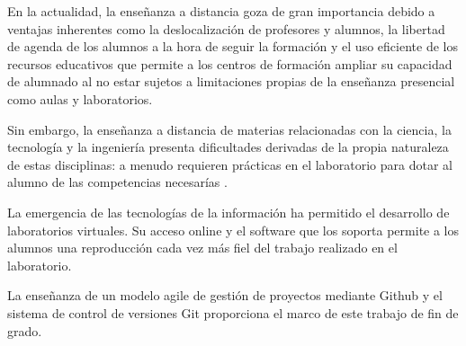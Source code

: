 
En la actualidad, la enseñanza a distancia goza de gran importancia debido a ventajas inherentes como la deslocalización de profesores y alumnos, la libertad de agenda de los alumnos a la hora de seguir la formación y el uso eficiente de los recursos educativos que permite a los centros de formación ampliar su capacidad de alumnado al no estar sujetos a limitaciones propias de la enseñanza presencial como aulas y laboratorios.

Sin embargo, la enseñanza a distancia de materias relacionadas con la ciencia, la tecnología y  la ingeniería  presenta dificultades derivadas de la propia naturaleza de estas disciplinas: a menudo requieren prácticas en el laboratorio para dotar al alumno de las competencias necesarías .

La emergencia de las tecnologías de la información ha permitido el desarrollo de laboratorios virtuales. Su acceso online y el software que los soporta permite a los alumnos una reproducción cada vez más fiel del trabajo realizado en el laboratorio.

La enseñanza de un modelo agile de gestión de proyectos mediante Github y el sistema de control de versiones Git proporciona el marco de este trabajo de fin de grado.



 